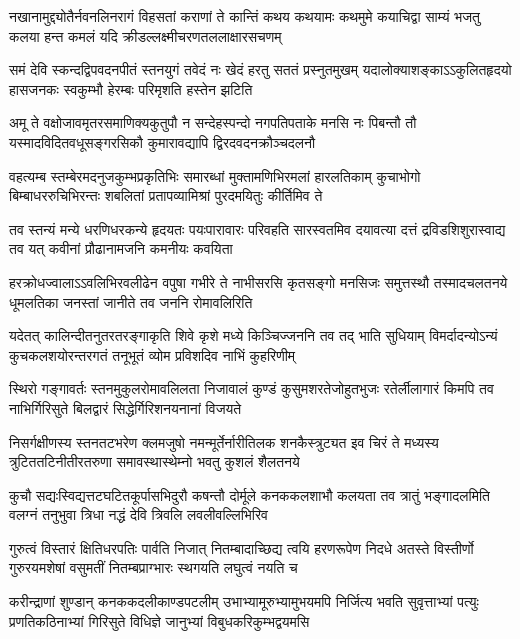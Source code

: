 \fourlineindentedshloka
{नखानामुद्द्योतैर्नवनलिनरागं विहसतां}
{कराणां ते कान्तिं कथय कथयामः कथमुमे}
{कयाचिद्वा साम्यं भजतु कलया हन्त कमलं}
{यदि क्रीडल्लक्ष्मीचरणतललाक्षारसचणम्}%

\fourlineindentedshloka
{समं देवि स्कन्दद्विपवदनपीतं स्तनयुगं}
{तवेदं नः खेदं हरतु सततं प्रस्नुतमुखम्}
{यदालोक्याशङ्काऽऽकुलितहृदयो हासजनकः}
{स्वकुम्भौ हेरम्बः परिमृशति हस्तेन झटिति}%

\fourlineindentedshloka
{अमू ते वक्षोजावमृतरसमाणिक्यकुतुपौ}
{न सन्देहस्पन्दो नगपतिपताके मनसि नः}
{पिबन्तौ तौ यस्मादविदितवधूसङ्गरसिकौ}
{कुमारावद्यापि द्विरदवदनक्रौञ्चदलनौ}%

\fourlineindentedshloka
{वहत्यम्ब स्तम्बेरमदनुजकुम्भप्रकृतिभिः}
{समारब्धां मुक्तामणिभिरमलां हारलतिकाम्}
{कुचाभोगो बिम्बाधररुचिभिरन्तः शबलितां}
{प्रतापव्यामिश्रां पुरदमयितुः कीर्तिमिव ते}%

\fourlineindentedshloka
{तव स्तन्यं मन्ये धरणिधरकन्ये हृदयतः}
{पयःपारावारः परिवहति सारस्वतमिव}
{दयावत्या दत्तं द्रविडशिशुरास्वाद्य तव यत्}
{कवीनां प्रौढानामजनि कमनीयः कवयिता}%

\fourlineindentedshloka
{हरक्रोधज्वालाऽऽवलिभिरवलीढेन वपुषा}
{गभीरे ते नाभीसरसि कृतसङ्गो मनसिजः}
{समुत्तस्थौ तस्मादचलतनये धूमलतिका}
{जनस्तां जानीते तव जननि रोमावलिरिति}%

\fourlineindentedshloka
{यदेतत् कालिन्दीतनुतरतरङ्गाकृति शिवे}
{कृशे मध्ये किञ्चिज्जननि तव तद् भाति सुधियाम्}
{विमर्दादन्योऽन्यं कुचकलशयोरन्तरगतं}
{तनूभूतं व्योम प्रविशदिव नाभिं कुहरिणीम्}%

\fourlineindentedshloka
{स्थिरो गङ्गावर्तः स्तनमुकुलरोमावलिलता}
{निजावालं कुण्डं कुसुमशरतेजोहुतभुजः}
{रतेर्लीलागारं किमपि तव नाभिर्गिरिसुते}
{बिलद्वारं सिद्धेर्गिरिशनयनानां विजयते}%

\fourlineindentedshloka
{निसर्गक्षीणस्य स्तनतटभरेण क्लमजुषो}
{नमन्मूर्तेर्नारीतिलक शनकैस्त्रुट्यत इव}
{चिरं ते मध्यस्य त्रुटिततटिनीतीरतरुणा}
{समावस्थास्थेम्नो भवतु कुशलं शैलतनये}%

\fourlineindentedshloka
{कुचौ सद्यःस्विद्यत्तटघटितकूर्पासभिदुरौ}
{कषन्तौ दोर्मूले कनककलशाभौ कलयता}
{तव त्रातुं भङ्गादलमिति वलग्नं तनुभुवा}
{त्रिधा नद्धं देवि त्रिवलि लवलीवल्लिभिरिव}%

\fourlineindentedshloka
{गुरुत्वं विस्तारं क्षितिधरपतिः पार्वति निजात्}
{नितम्बादाच्छिद्य त्वयि हरणरूपेण निदधे}
{अतस्ते विस्तीर्णो गुरुरयमशेषां वसुमतीं}
{नितम्बप्राग्भारः स्थगयति लघुत्वं नयति च}%

\fourlineindentedshloka
{करीन्द्राणां शुण्डान् कनककदलीकाण्डपटलीम्}
{उभाभ्यामूरुभ्यामुभयमपि निर्जित्य भवति}
{सुवृत्ताभ्यां पत्युः प्रणतिकठिनाभ्यां गिरिसुते}
{विधिज्ञे जानुभ्यां विबुधकरिकुम्भद्वयमसि}%

